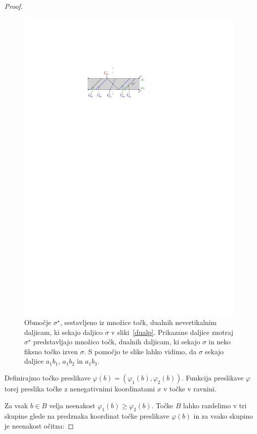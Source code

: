 \documentclass[a4paper, 12pt]{book}
\begin{document}
\begin{proof}
\begin{figure}[htp]
\centerline{\includegraphics[scale=1.2]{pics/duality-vertical-slab.pdf}}
\caption{Območje $\sigma^\star$, sestavljeno iz množice točk, dualnih nevertikalnim daljicam, ki sekajo daljico $\sigma$ v sliki~\ref{dualp}. Prikazane daljice znotraj $\sigma^\star$ predstavljajo množico točk, dualnih daljicam, ki sekajo $\sigma$ in neko fiksno točko izven $\sigma$. S pomočjo te slike lahko vidimo, da $\sigma$ sekajo daljice $a_1b_1$, $a_1b_2$ in $a_1b_3$.} 
\label{hslab}
\end{figure}

Definirajmo točko preslikave $\varphi(b)=(\varphi_1(b),\varphi_2(b))$. Funkcija preslikave $\varphi$ torej preslika točke z nenegativnimi koordinatami $x$ v točke v ravnini.

Za vsak $b\in B$ velja neenakost $\varphi_1(b) \geq \varphi_2(b)$. Točke $B$ lahko razdelimo v tri skupine glede na predznaka koordinat točke preslikave $\varphi(b)$ in za vsako skupino je neenakost očitna:


\end{proof}
\end{document}

